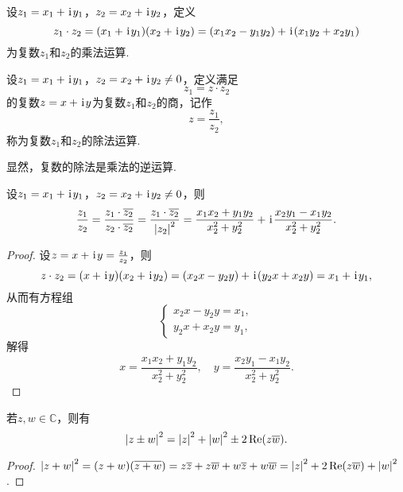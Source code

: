 \begin{definition}[复数乘法]
设\(z_1 = x_1 + \kern1pt\mathrm{i}\kern1pt y_1\)，\(z_2 = x_2 + \kern1pt\mathrm{i}\kern1pt y_2\)，定义\begin{equation*}
z_1 \cdot z_2
= (x_1 + \kern1pt\mathrm{i}\kern1pt y_1)(x_2 + \kern1pt\mathrm{i}\kern1pt y_2)
= (x_1 x_2 - y_1 y_2)+\kern1pt\mathrm{i}\kern1pt(x_1 y_2 + x_2 y_1)
\end{equation*}为复数\(z_1\)和\(z_2\)的乘法运算.
\end{definition}

\begin{definition}[复数除法]
设\(z_1 = x_1 + \kern1pt\mathrm{i}\kern1pt y_1\)，\(z_2 = x_2 + \kern1pt\mathrm{i}\kern1pt y_2 \neq 0\)，定义满足\begin{equation*}
z_1 = z \cdot z_2
\end{equation*}的复数\(z = x + \kern1pt\mathrm{i}\kern1pt y\)为复数\(z_1\)和\(z_2\)的商，记作\begin{equation*}
z = \frac{z_1}{z_2},
\end{equation*}称为复数\(z_1\)和\(z_2\)的除法运算.

显然，复数的除法是乘法的逆运算.
\end{definition}

\begin{theorem}
设\(z_1 = x_1 + \kern1pt\mathrm{i}\kern1pt y_1\)，\(z_2 = x_2 + \kern1pt\mathrm{i}\kern1pt y_2 \neq 0\)，则\begin{equation*}
\frac{z_1}{z_2}
= \frac{z_1 \cdot \overline{z_2}}{z_2 \cdot \overline{z_2}}
= \frac{z_1 \cdot \overline{z_2}}{\abs{z_2}^2}
= \frac{x_1 x_2 + y_1 y_2}{x_2^2 + y_2^2}
+ \kern1pt\mathrm{i}\kern1pt \frac{x_2 y_1 - x_1 y_2}{x_2^2 + y_2^2}.
\end{equation*}
\begin{proof}
设\(z = x + \kern1pt\mathrm{i}\kern1pt y = \frac{z_1}{z_2}\)，则\begin{equation*}
z \cdot z_2 = (x + \kern1pt\mathrm{i}\kern1pt y)(x_2 + \kern1pt\mathrm{i}\kern1pt y_2)
= (x_2 x - y_2 y) + \kern1pt\mathrm{i}\kern1pt(y_2 x + x_2 y)
= x_1 + \kern1pt\mathrm{i}\kern1pt y_1,
\end{equation*}从而有方程组\begin{equation*}
\left\{ \begin{array}{l}
x_2 x - y_2 y = x_1, \\
y_2 x + x_2 y = y_1,
\end{array} \right.
\end{equation*}解得\begin{equation*}
x = \frac{x_1 x_2 + y_1 y_2}{x_2^2 + y_2^2},
\quad
y = \frac{x_2 y_1 - x_1 y_2}{x_2^2 + y_2^2}.
\end{equation*}
\end{proof}
\end{theorem}

\begin{theorem}
若\(z,w \in \mathbb{C}\)，则有\begin{equation}
	\abs{z \pm w}^2
	= \abs{z}^2 + \abs{w}^2 \pm 2 \Re(z \overline{w}).
\end{equation}
\begin{proof}
\(
	\abs{z + w}^2
	= (z + w) (\overline{z + w})
	= z\overline{z}
		+ z\overline{w}
		+ w\overline{z}
		+ w\overline{w}
	= \abs{z}^2 + 2 \Re(z\overline{w}) + \abs{w}^2
\).
\end{proof}
\end{theorem}

